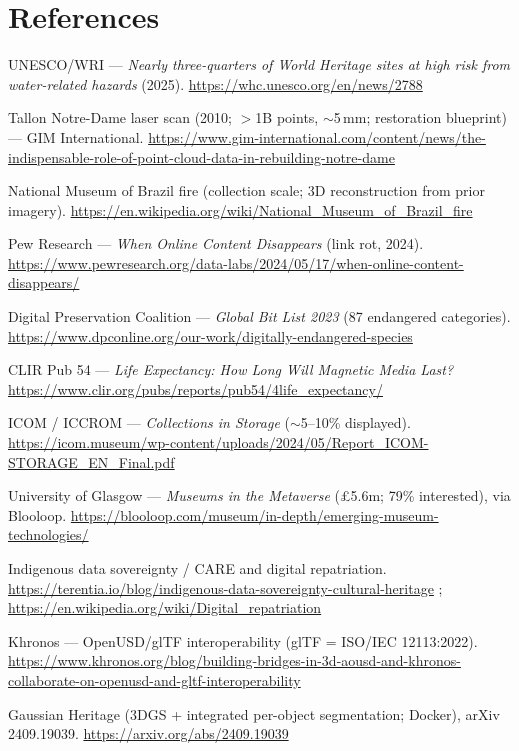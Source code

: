 \documentclass[a4paper,11pt]{article}
\begin{document}
\section*{References}
\small
\begin{enumerate}[leftmargin=2.2em,label={[\arabic*]}]
\item UNESCO/WRI --- \emph{Nearly three-quarters of World Heritage sites at high risk from water-related hazards} (2025). \url{https://whc.unesco.org/en/news/2788}
\item Tallon Notre-Dame laser scan (2010; $>$1B points, $\sim$5\,mm; restoration blueprint) --- GIM International. \url{https://www.gim-international.com/content/news/the-indispensable-role-of-point-cloud-data-in-rebuilding-notre-dame}
\item National Museum of Brazil fire (collection scale; 3D reconstruction from prior imagery). \url{https://en.wikipedia.org/wiki/National_Museum_of_Brazil_fire}
\item Pew Research --- \emph{When Online Content Disappears} (link rot, 2024). \url{https://www.pewresearch.org/data-labs/2024/05/17/when-online-content-disappears/}
\item Digital Preservation Coalition --- \emph{Global Bit List 2023} (87 endangered categories). \url{https://www.dpconline.org/our-work/digitally-endangered-species}
\item CLIR Pub 54 --- \emph{Life Expectancy: How Long Will Magnetic Media Last?} \url{https://www.clir.org/pubs/reports/pub54/4life_expectancy/}
\item ICOM / ICCROM --- \emph{Collections in Storage} ($\sim$5--10\% displayed). \url{https://icom.museum/wp-content/uploads/2024/05/Report_ICOM-STORAGE_EN_Final.pdf}
\item University of Glasgow --- \emph{Museums in the Metaverse} (\pounds5.6m; 79\% interested), via Blooloop. \url{https://blooloop.com/museum/in-depth/emerging-museum-technologies/}
\item Indigenous data sovereignty / CARE and digital repatriation. \url{https://terentia.io/blog/indigenous-data-sovereignty-cultural-heritage} ; \url{https://en.wikipedia.org/wiki/Digital_repatriation}
\item Khronos --- OpenUSD/glTF interoperability (glTF = ISO/IEC 12113:2022). \url{https://www.khronos.org/blog/building-bridges-in-3d-aousd-and-khronos-collaborate-on-openusd-and-gltf-interoperability}
\item Gaussian Heritage (3DGS + integrated per-object segmentation; Docker), arXiv 2409.19039. \url{https://arxiv.org/abs/2409.19039}

\end{enumerate}
\end{document}
